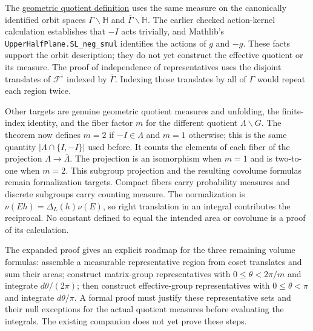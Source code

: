The \hyperref[modular.quotient-measure]{geometric quotient definition} uses the same measure on the canonically identified orbit spaces $\Gamma\backslash\mathbb H$ and $\overline\Gamma\backslash\mathbb H$. The earlier checked action-kernel calculation establishes that $-I$ acts trivially, and Mathlib's \texttt{UpperHalfPlane.SL\_neg\_smul} identifies the actions of $g$ and $-g$. These facts support the orbit description; they do not yet construct the effective quotient or its measure. The proof of independence of representatives uses the disjoint translates of $\mathcal F^\circ$ indexed by $\overline\Gamma$. Indexing those translates by all of $\Gamma$ would repeat each region twice.

Other targets are genuine geometric quotient measures and unfolding, the finite-index identity, and the fiber factor $m$ for the different quotient $\Lambda\backslash G$. The theorem now defines $m=2$ if $-I\in\Lambda$ and $m=1$ otherwise; this is the same quantity $|\Lambda\cap\{I,-I\}|$ used before. It counts the elements of each fiber of the projection $\Lambda\to\overline\Lambda$. The projection is an isomorphism when $m=1$ and is two-to-one when $m=2$. This subgroup projection and the resulting covolume formulas remain formalization targets. Compact fibers carry probability measures and discrete subgroups carry counting measure. The normalization is $\nu(Eh)=\Delta_L(h)\nu(E)$, so right translation in an integral contributes the reciprocal. No constant defined to equal the intended area or covolume is a proof of its calculation.

The expanded proof gives an explicit roadmap for the three remaining volume formulas: assemble a measurable representative region from coset translates and sum their areas; construct matrix-group representatives with $0\leq\theta<2\pi/m$ and integrate $d\theta/(2\pi)$; then construct effective-group representatives with $0\leq\theta<\pi$ and integrate $d\theta/\pi$. A formal proof must justify these representative sets and their null exceptions for the actual quotient measures before evaluating the integrals. The existing companion does not yet prove these steps.
